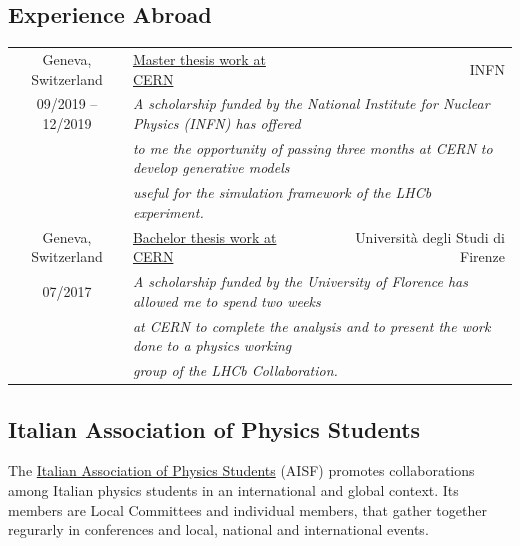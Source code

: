 \documentclass[a4paper, 11pt, notitlepage]{article}
\begin{document}
\vskip 6mm

\subsection*{Experience Abroad}
\begin{tabular}{clr}
    {\small Geneva, Switzerland} & \ul{Master thesis work at CERN} & {\small INFN}\\
    {\small 09/2019 -- 12/2019} & \multicolumn{2}{l}{\small \emph {A scholarship funded by the National Institute for Nuclear Physics (INFN) has offered}}\\
    & \multicolumn{2}{l}{\small \emph {to me the opportunity of passing three months at CERN to develop generative models}}\\
    & \multicolumn{2}{l}{\small \emph {useful for the simulation framework of the LHCb experiment.}}\\ [3 mm]
    
    {\small Geneva, Switzerland} & \ul{Bachelor thesis work at CERN} & {\small Università degli Studi di Firenze}\\
    {\small 07/2017} & \multicolumn{2}{l}{\small \emph {A scholarship funded by the University of Florence has allowed me to spend two weeks}}\\
    & \multicolumn{2}{l}{\small \emph {at CERN to complete the analysis and to present the work done to a physics working}}\\
    & \multicolumn{2}{l}{\small \emph {group of the LHCb Collaboration.}}\\ [3 mm]
\end{tabular}

\vskip 6mm

\subsection*{Italian Association of Physics Students}
{\small The \href{http://ai-sf.it/}{Italian Association of Physics Students} (AISF) promotes collaborations among Italian physics students in an international and global context. Its members are Local Committees and individual members, that gather together regurarly in conferences and local, national and international events.}\\
\end{document}
